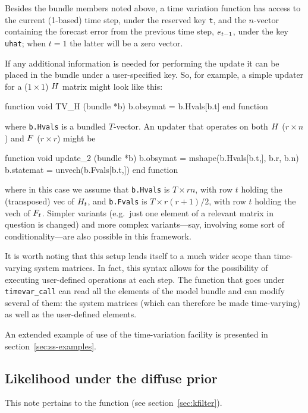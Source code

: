 Besides the bundle members noted above, a time variation function has
access to the current (1-based) time step, under the reserved key
\texttt{t}, and the $n$-vector containing the forecast error from the
previous time step, $e_{t-1}$, under the key \texttt{uhat};
when $t=1$ the latter will be a zero vector.

If any additional information is needed for performing the update it
can be placed in the bundle under a user-specified key.  So, for
example, a simple updater for a ($1 \times 1$) $H$ matrix might
look like this:
%
\begin{code}
function void TV_H (bundle *b)
    b.obsymat = b.Hvals[b.t]
end function
\end{code}
%
where \texttt{b.Hvals} is a bundled $T$-vector. An updater that
operates on both $H$ ($r \times n$) and $F$ ($r \times
r$) might be
%
\begin{code}
function void update_2 (bundle *b)
    b.obsymat = mshape(b.Hvals[b.t,], b.r, b.n)
    b.statemat = unvech(b.Fvals[b.t,])
end function
\end{code}
%
where in this case we assume that \texttt{b.Hvals} is $T \times rn$,
with row $t$ holding the (transposed) vec of $H_t$, and
\texttt{b.Fvals} is $T \times r(r+1)/2$, with row $t$ holding the vech
of $F_t$. Simpler variants (e.g.\ just one element of a
relevant matrix in question is changed) and more complex
variants---say, involving some sort of conditionality---are also
possible in this framework.

It is worth noting that this setup lends itself to a much wider scope
than time-varying system matrices. In fact, this syntax allows for the
possibility of executing user-defined operations at each step. The
function that goes under \texttt{timevar\_call} can read all the
elements of the model bundle and can modify several of them: the
system matrices (which can therefore be made time-varying) as well as
the user-defined elements.

An extended example of use of the time-variation facility is presented
in section~\ref{sec:ss-examples}.

\subsection{Likelihood under the diffuse prior}
\label{sec:lldiffuse}

This note pertains to the  function (see
section~\ref{sec:kfilter}). 


